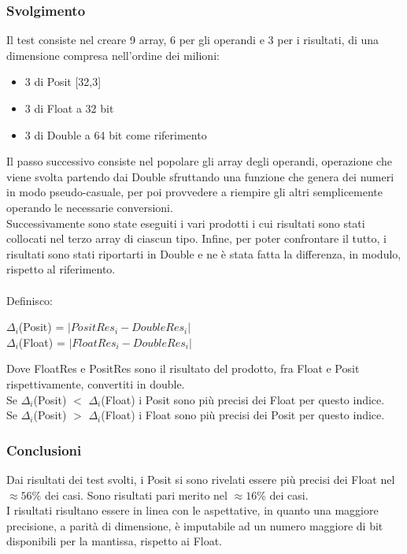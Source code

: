 \documentclass[a4paper,11pt]{article}
\begin{document}
\subsubsection{Svolgimento}
Il test consiste nel creare 9 array, 6 per gli operandi e 3 per i risultati, di una dimensione compresa nell'ordine dei milioni: \begin{itemize}
	\item 3 di Posit [32,3]
	\item 3 di Float a 32 bit 
	\item 3 di Double a 64 bit come riferimento
\end{itemize} Il passo successivo consiste nel popolare gli array degli operandi, operazione che viene svolta partendo dai Double sfruttando una funzione che genera dei numeri in modo pseudo-casuale, per poi provvedere a riempire gli altri semplicemente operando le necessarie conversioni.\\
Successivamente sono state eseguiti i vari prodotti i cui risultati sono stati collocati nel terzo array di ciascun tipo. Infine, per poter confrontare il tutto, i risultati sono stati riportarti in Double e ne è stata fatta la differenza, in modulo, rispetto al riferimento.\\\\ Definisco: \begin{center}  $\Delta_i$(Posit) = $|PositRes_i - DoubleRes_i|$  \\ $\Delta_i$(Float)  = $|FloatRes_i - DoubleRes_i|$ \end{center} 
Dove FloatRes e PositRes sono il risultato del prodotto, fra Float e Posit rispettivamente, convertiti in double. \\Se $\Delta_i$(Posit) $<$ $\Delta_i$(Float) i Posit sono più precisi dei Float per questo indice.\\ Se $\Delta_i$(Posit) $>$ $\Delta_i$(Float) i Float sono più precisi dei Posit per questo indice.

\subsubsection{Conclusioni}
Dai risultati dei test svolti, i Posit si sono rivelati essere più precisi dei Float nel $\approx56$\% dei casi. Sono risultati pari merito nel $\approx16$\% dei casi.\\
I risultati risultano essere in linea con le aspettative, in quanto una maggiore precisione, a parità di dimensione, è imputabile ad un numero maggiore di bit disponibili per la mantissa, rispetto ai Float. 
\end{document}
